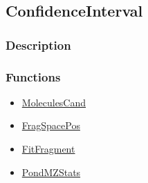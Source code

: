 \subsection{ConfidenceInterval}\label{ConfidenceInterval}
\subsubsection{Description}


\subsubsection{Functions}
\begin{itemize}
\item \hyperref[MoleculesCand]{MoleculesCand}
\item \hyperref[FragSpacePos]{FragSpacePos}
\item \hyperref[FitFragment]{FitFragment}
\item \hyperref[PondMZStats]{PondMZStats}
\end{itemize}

